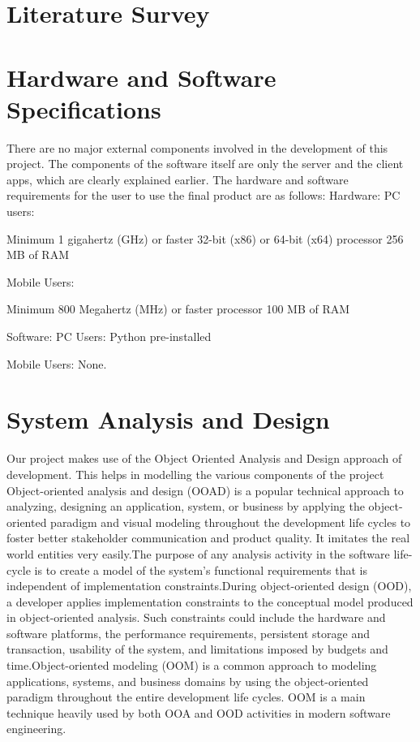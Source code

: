 \documentclass[a4paper]{report}
\begin{document}
\chapter{Literature Survey}

\chapter{Hardware and Software Specifications}
There are no major external components involved in the development of this project. The components of the software itself are only the server and the client apps, which are clearly explained earlier.
The hardware and software requirements for the user to use the final 
product are as follows:
Hardware:
PC users:

Minimum 1 gigahertz (GHz) or faster 32-bit (x86) or 64-bit (x64) processor 256 MB of RAM

Mobile Users:

Minimum 800 Megahertz (MHz) or faster processor 100 MB of RAM

Software:
PC Users:
Python pre-installed

Mobile Users:
None.

\chapter{System Analysis and Design}

Our project makes use of the Object Oriented Analysis and Design approach of development. This helps in modelling the various components of the project Object-oriented analysis and design (OOAD) is a popular technical approach to analyzing, designing an application, system, or business by applying the object-oriented paradigm and visual modeling throughout the development life cycles to foster better stakeholder communication and product quality. It imitates the real world entities very easily.The purpose of any analysis activity in the software life-cycle is to create a model of the system's functional requirements that is independent of implementation constraints.During object-oriented design (OOD), a developer applies 
implementation constraints to the conceptual model produced in object-oriented analysis. Such constraints could include the hardware and software platforms, the performance requirements, persistent storage and transaction, usability of the system, and limitations imposed by budgets and time.Object-oriented modeling (OOM) is a common approach to modeling applications, systems, and business domains by using the object-oriented paradigm throughout the entire development life cycles. OOM is a main technique heavily used by both OOA and OOD activities in modern software engineering.
\end{document}
